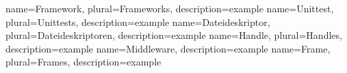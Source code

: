 \makeglossaries 

{
	name={Framework},  
	plural={Frameworks},
	description={example}
}  
{
	name={Unittest},  
	plural={Unittests},
	description={example}
}  
{
	name={Dateideskriptor},  
	plural={Dateideskriptoren},
	description={example}
}  
{
	name={Handle},  
	plural={Handles},
	description={example}
} 
{
	name={Middleware},  
	description={example}
} 
{
	name={Frame},
	plural={Frames},  
	description={example}
} 